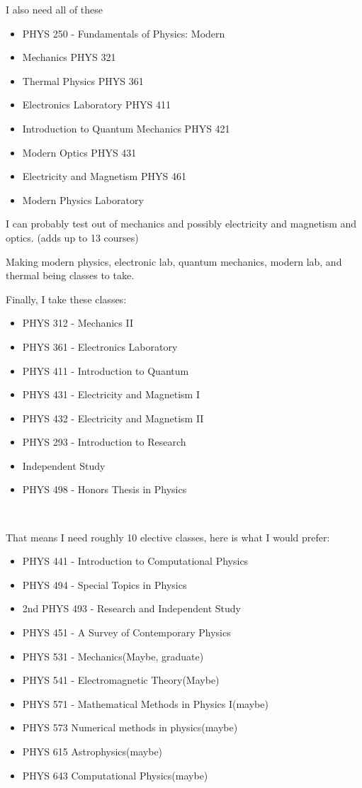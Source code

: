 \par I also need all of these
\begin{itemize}
\item PHYS 250 - Fundamentals of Physics: Modern 
\item Mechanics PHYS 321 
\item Thermal Physics PHYS 361 
\item Electronics Laboratory PHYS 411 
\item Introduction to Quantum Mechanics PHYS 421 
\item Modern Optics PHYS 431 
\item Electricity and Magnetism PHYS 461 
\item Modern Physics Laboratory
\end{itemize}
\par I can probably test out of mechanics and possibly electricity and magnetism and optics.
(adds up to 13 courses)
\par Making modern physics, electronic lab, quantum mechanics, modern lab, and thermal being classes to take.
\\ 
\par Finally, I take these classes:
\begin{itemize}
    \item PHYS 312 - Mechanics II 
    \item PHYS 361 - Electronics Laboratory 
    \item PHYS 411 - Introduction to Quantum  
    \item PHYS 431 - Electricity and Magnetism I \item PHYS 432 - Electricity and Magnetism II \item PHYS 293 - Introduction to Research  \item Independent Study
    \item PHYS 498 - Honors Thesis in Physics
\end{itemize}
\\
\par That means I need roughly 10 elective classes, here is what I would prefer:
\begin{itemize}
    \item PHYS 441 - Introduction to Computational Physics
    \item PHYS 494 - Special Topics in Physics 
    \item 2nd PHYS 493 - Research and Independent Study \item PHYS 451 - A Survey of Contemporary Physics
    \item PHYS 531 - Mechanics(Maybe, graduate)
    \item PHYS 541 - Electromagnetic Theory(Maybe)
    \item PHYS 571 - Mathematical Methods in Physics I(maybe)
    \item PHYS 573 Numerical methods in physics(maybe)
    \item PHYS 615 Astrophysics(maybe)
    \item PHYS 643 Computational Physics(maybe)
\end{itemize}
